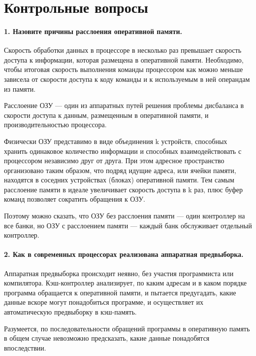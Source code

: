 \chapter*{Контрольные вопросы}

\subsubsection{\textbf{1. Назовите причины расслоения оперативной памяти.}}

Скорость обработки данных в процессоре в несколько раз превышает скорость доступа к информации, которая размещена в оперативной памяти. Необходимо, чтобы итоговая скорость выполнения команды процессором как можно меньше зависела от скорости доступа к коду команды и к используемым в ней операндам из памяти. 

Расслоение ОЗУ — один из аппаратных путей решения проблемы дисбаланса в скорости доступа к данным, размещенным в оперативной памяти, и производительностью процессора.

Физически ОЗУ представимо в виде объединения k устройств, способных хранить одинаковое количество информации и способных взаимодействовать с процессором независимо друг от друга. При этом адресное пространство организовано таким образом, что подряд идущие адреса, или ячейки памяти, находятся в соседних устройствах (блоках) оперативной памяти. Тем самым расслоение памяти в идеале увеличивает скорость доступа в k раз, плюс буфер команд позволяет сократить обращения к ОЗУ.

Поэтому можно сказать, что ОЗУ без расслоения памяти — один контроллер на все банки, но ОЗУ с расслоением памяти — каждый банк обслуживает отдельный контроллер.

\subsubsection{\textbf{2. Как в современных процессорах реализована аппаратная предвыборка.}}

Аппаратная предвыборка происходит неявно, без участия программиста или компилятора. Кэш-контроллер анализирует, по каким адресам и в каком порядке программа обращается к оперативной памяти, и пытается предугадать, какие данные вскоре могут понадобиться программе, и осуществляет их автоматическую предвыборку в кэш-память.

Разумеется, по последовательности обращений программы в оперативную память в общем случае невозможно предсказать, какие данные понадобятся впоследствии.

